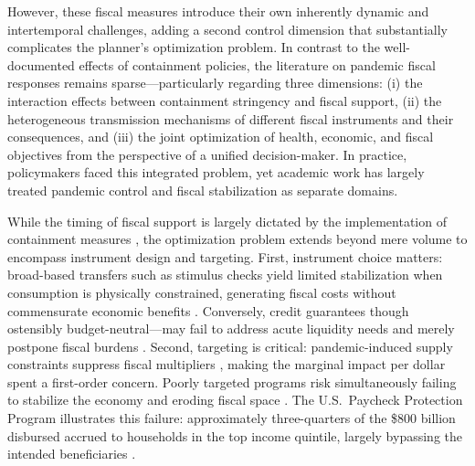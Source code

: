 \documentclass[12pt, a4paper]{article}
\begin{document}
However, these fiscal measures introduce their own inherently dynamic and intertemporal challenges, adding a second control dimension that substantially complicates the planner's optimization problem. In 
contrast to the well-documented effects of containment policies, the literature on pandemic fiscal responses remains sparse—particularly regarding three dimensions: (i) the interaction effects between 
containment stringency and fiscal support, (ii) the heterogeneous transmission mechanisms of different fiscal instruments and their consequences, and (iii) the joint optimization of health, economic, and fiscal objectives from the perspective of a unified decision-maker. In practice, policymakers faced this integrated problem, yet academic work has largely treated pandemic control and fiscal stabilization as separate domains.


While the timing of fiscal support is largely dictated by the implementation of containment measures \citep{deb2021}, the optimization problem extends beyond mere volume to encompass instrument design and targeting. First, instrument choice matters: broad-based transfers such as stimulus checks yield limited stabilization when consumption is physically constrained, generating fiscal costs without commensurate economic benefits \citep{chetty2020e, coibion2020stimulus}. Conversely, credit guarantees though ostensibly budget-neutral—may fail to address acute liquidity needs and merely postpone fiscal burdens \citep{fariaecastro2020f}. Second, targeting is critical: pandemic-induced supply constraints suppress fiscal multipliers \citep{auerbach2022}, making the marginal impact per dollar spent a first-order concern. Poorly targeted programs risk simultaneously failing to stabilize the 
economy and eroding fiscal space \citep{bayer2023c}. The U.S.\ Paycheck Protection Program illustrates this failure: approximately three-quarters of the \$800 billion disbursed accrued to households in the top income quintile, largely bypassing the intended beneficiaries \citep{Autor2022}.
\end{document}
